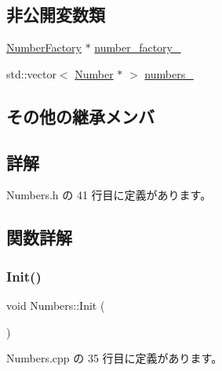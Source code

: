 \subsection*{非公開変数類}
\begin{DoxyCompactItemize}
\item 
\mbox{\hyperlink{class_number_factory}{Number\+Factory}} $\ast$ \mbox{\hyperlink{class_numbers_af9e8fa1658caf4beddfb6f450d8dc053}{number\+\_\+factory\+\_\+}}
\item 
std\+::vector$<$ \mbox{\hyperlink{class_number}{Number}} $\ast$ $>$ \mbox{\hyperlink{class_numbers_ab0649eccc71117670e5dc1ecc4cbe2a2}{numbers\+\_\+}}
\end{DoxyCompactItemize}
\subsection*{その他の継承メンバ}


\subsection{詳解}


 Numbers.\+h の 41 行目に定義があります。



\subsection{関数詳解}
\mbox{\label{class_numbers_a42158aa8dbb71308161c642aed8752e8}} 
\subsubsection{\texorpdfstring{Init()}{Init()}}
{\footnotesize\ttfamily void Numbers\+::\+Init (\begin{DoxyParamCaption}{ }\end{DoxyParamCaption})}



 Numbers.\+cpp の 35 行目に定義があります。

